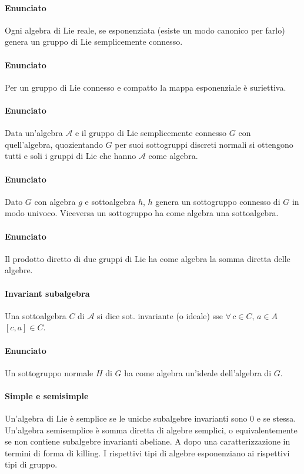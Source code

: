 \documentclass[12pt,oneside,notitlepage,abstracton,a4paper]{scrartcl}
\newcommand{\A}{\mathcal{A}}
\begin{document}
\paragraph{Enunciato} Ogni algebra di Lie reale, se esponenziata (esiste un modo canonico per farlo) genera un gruppo di Lie semplicemente connesso.
\paragraph{Enunciato} Per un gruppo di Lie connesso e compatto la mappa esponenziale è suriettiva.
\paragraph{Enunciato} Data un'algebra $\A$ e il gruppo di Lie semplicemente connesso $G$ con quell'algebra, quozientando $G$ per suoi sottogruppi discreti normali si ottengono tutti e soli i gruppi di Lie che hanno $\A$ come algebra.
\paragraph{Enunciato} Dato $G$ con algebra $\mathit{g}$ e sottoalgebra $\mathit{h}$, $\mathit{h}$ genera un sottogruppo connesso di $G$ in modo univoco. Viceversa un sottogruppo ha come algebra una sottoalgebra.
\paragraph{Enunciato} Il prodotto diretto di due gruppi di Lie ha come algebra la somma diretta delle algebre.

\paragraph{Invariant subalgebra} Una sottoalgebra $C$ di $\A$ si dice sot. invariante (o ideale) sse $\forall\, c\in C,\, a\in A$ $[c,a] \in C$.

\paragraph{Enunciato} Un sottogruppo normale $H$ di $G$ ha come algebra un'ideale dell'algebra di $G$.

\paragraph{Simple e semisimple} Un'algebra di Lie è semplice se le uniche subalgebre invarianti sono $0$ e se stessa. Un'algebra semisemplice è somma diretta di algebre semplici, o equivalentemente se non contiene subalgebre invarianti abeliane. A dopo una caratterizzazione in termini di forma di killing. I rispettivi tipi di algebre esponenziano ai rispettivi tipi di gruppo.
\end{document}
